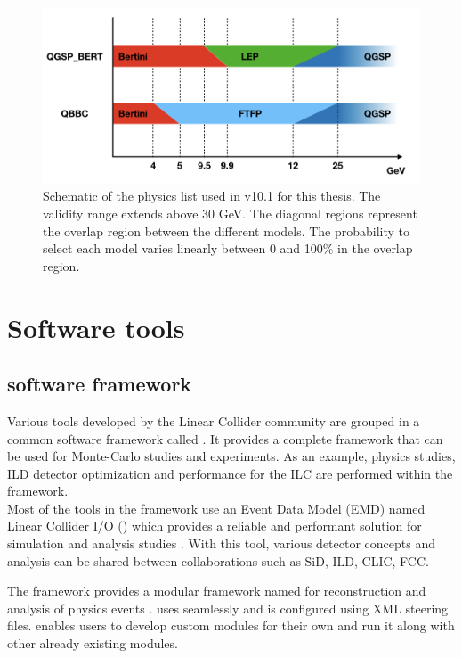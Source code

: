 \begin{figure}[htbp!]
  \centering
  \includegraphics[width=1\linewidth]{chap4/fig/PhysicsLists.jpeg}
  \caption{Schematic of the physics list used in \geant v10.1 for this thesis. The validity range extends above 30 GeV. The diagonal regions represent the overlap region between the different models. The probability to select each model varies linearly between 0 and 100\% in the overlap region.} \label{fig:physics_list}
\end{figure}

\section{Software tools}
\label{sec:Software}

\subsection{\ilcsoft software framework}

Various tools developed by the Linear Collider community are grouped in a common software framework called \ilcsoft \cite{ILCSoftPortal}. It provides a complete framework that can be used for Monte-Carlo studies and experiments. As an example, physics studies, ILD detector optimization and performance for the ILC are performed within the \ilcsoft framework.\\

Most of the tools in the framework use an Event Data Model (EMD) named Linear Collider I/O (\lcio) which provides a reliable and performant solution for simulation and analysis studies \cite{Gaede:2003ip}. With this tool, various detector concepts and analysis can be shared between collaborations such as SiD, ILD, CLIC, FCC.

The \ilcsoft framework provides a modular \cpp framework named \marlin for reconstruction and analysis of physics events \cite{Gaede:2006pj}. \marlin uses \lcio seamlessly and is configured using XML steering files. \marlin enables users to develop custom modules for their own and run it along with other already existing modules.

